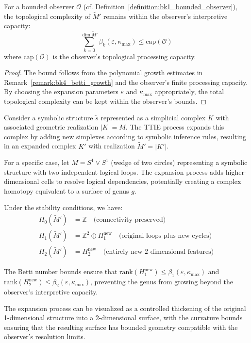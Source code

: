 \begin{corollary}
\label{corollary:bk4_homological_coherence_observer_bounds}
For a bounded observer $\mathcal{O}$ (cf. Definition~\ref{definition:bk1_bounded_observer}), the topological complexity of $\widetilde{M}'$ remains within the observer's interpretive capacity:
\[
\sum_{k=0}^{\dim \widetilde{M}'} \beta_k(\varepsilon, \kappa_{\max}) \leq \text{cap}(\mathcal{O})
\]
where $\text{cap}(\mathcal{O})$ is the observer's topological processing capacity.
\end{corollary}

\begin{proof}
\label{proof:bk4_observer_capacity_bound}
The bound follows from the polynomial growth estimates in Remark~\ref{remark:bk4_betti_growth} and the observer's finite processing capacity. By choosing the expansion parameters $\varepsilon$ and $\kappa_{\max}$ appropriately, the total topological complexity can be kept within the observer's bounds.
\end{proof}

\begin{demonstratio}
\label{demonstratio:bk4_symbolic_graph_topological_stability}
Consider a symbolic structure $\tilde{s}$ represented as a simplicial complex $K$ with associated geometric realization $|K| = M$. The TTIE process expands this complex by adding new simplexes according to symbolic inference rules, resulting in an expanded complex $K'$ with realization $\widetilde{M}' = |K'|$.

For a specific case, let $M = S^1 \vee S^1$ (wedge of two circles) representing a symbolic structure with two independent logical loops. The expansion process adds higher-dimensional cells to resolve logical dependencies, potentially creating a complex homotopy equivalent to a surface of genus $g$.

Under the stability conditions, we have:
\begin{align}
H_0(\widetilde{M}') &= \mathbb{Z} \quad \text{(connectivity preserved)} \\
H_1(\widetilde{M}') &= \mathbb{Z}^2 \oplus H_1^{\mathrm{new}} \quad \text{(original loops plus new cycles)} \\
H_2(\widetilde{M}') &= H_2^{\mathrm{new}} \quad \text{(entirely new 2-dimensional features)}
\end{align}

The Betti number bounds ensure that $\text{rank}(H_1^{\mathrm{new}}) \leq \beta_1(\varepsilon, \kappa_{\max})$ and $\text{rank}(H_2^{\mathrm{new}}) \leq \beta_2(\varepsilon, \kappa_{\max})$, preventing the genus from growing beyond the observer's interpretive capacity.

The expansion process can be visualized as a controlled thickening of the original 1-dimensional structure into a 2-dimensional surface, with the curvature bounds ensuring that the resulting surface has bounded geometry compatible with the observer's resolution limits.
\end{demonstratio}

